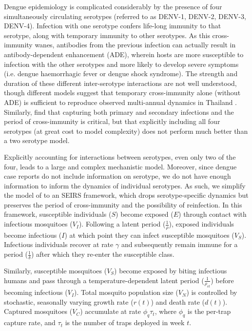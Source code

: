 \documentclass[10pt,letterpaper]{article}
\begin{document}
Dengue epidemiology is complicated considerably by the presence of four simultaneously circulating serotypes (referred to as DENV-1, DENV-2, DENV-3, DENV-4).
Infection with one serotype confers life-long immunity to that serotype, along with temporary immunity to other serotypes.  
As this cross-immunity wanes, antibodies from the previous infection can actually result in antibody-dependent enhancement (ADE), wherein hosts are more susceptible to infection with the other serotypes and more likely to develop severe symptoms (i.e. dengue haemorrhagic fever or dengue shock syndrome).
The strength and duration of these different inter-serotype interactions are not well understood, though different models suggest that temporary cross-immunity alone (without ADE) is sufficient to reproduce observed multi-annual dynamics in Thailand \cite{Wearing2006,Reich2013}.
Similarly, \cite{Aguiar2013} find that capturing both primary and secondary infections and the period of cross-immunity is critical, but that explicitly including all four serotypes (at great cost to model complexity) does not perform much better than a two serotype model.

Explicitly accounting for interactions between serotypes, even only two of the four, leads to a large and complex mechanistic model.
Moreover, since dengue case reports do not include information on serotype, we do not have enough information to inform the dynamics of individual serotypes.
As such, we simplify the model of \cite{Wearing2006} to an SEIRS framework, which drops serotype-specific dynamics but preserves the period of cross-immunity and the possibility of reinfection.
In this framework, susceptible individuals ($S$) become exposed ($E$) through contact with infectious mosquitoes ($V_I$).
Following a latent period ($\frac{1}{\rho}$), exposed individuals become infectious ($I$) at which point they can infect susceptible mosquitoes ($V_S$).
Infectious individuals recover at rate $\gamma$ and subsequently remain immune for a period ($\frac{1}{\delta}$) after which they re-enter the susceptible class.

Similarly, susceptible mosquitoes ($V_S$) become exposed by biting infectious humans and pass through a temperature-dependent latent period ($\frac{1}{\rho_{vt}}$) before becoming infectious ($V_I$).
Total mosquito population size ($V_N$) is controlled by stochastic, seasonally varying growth rate ($r(t)$) and death rate ($d(t)$).
Captured mosquitoes ($V_C$) accumulate at rate $\phi_q \tau_t$, where $\phi_q$ is the per-trap capture rate, and $\tau_t$ is the number of traps deployed in week $t$.
\end{document}
